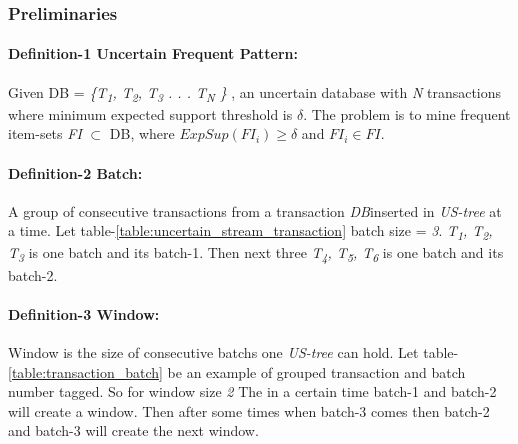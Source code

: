 \documentclass[conference]{IEEEtran}
\begin{document}
\subsubsection{Preliminaries}
\paragraph{Definition-1 Uncertain Frequent Pattern: }
    Given DB = \emph{\{T\textsubscript{1}, T\textsubscript{2}, T\textsubscript{3} . . . T\textsubscript{N} \}} , an uncertain database with \emph{N} transactions where minimum expected support threshold is $\delta$. The problem is to mine frequent item-sets \emph{FI} $\subset$ DB, where $ExpSup(FI_i) \geq \delta $ and $FI_i \in FI$.
    
    \paragraph{Definition-2 Batch: }
    A group of consecutive transactions from a transaction \emph{DB}inserted in \emph{US-tree} at a time. Let table-\ref{table:uncertain_stream_transaction} batch size = \emph{3}. \emph{T\textsubscript{1}, T\textsubscript{2}, T\textsubscript{3}} is one batch and its batch-1. Then next three \emph{T\textsubscript{4}, T\textsubscript{5}, T\textsubscript{6}} is one batch and its batch-2.
    
    \paragraph{Definition-3 Window: } Window is the size of consecutive batchs one \emph{US-tree} can hold. Let table-\ref{table:transaction_batch} be an example of grouped transaction and batch number tagged. So for window size \emph{2} The in a certain time batch-1 and batch-2 will create a window. Then after some times when batch-3 comes then batch-2 and batch-3 will create the next window.
    
\end{document}
